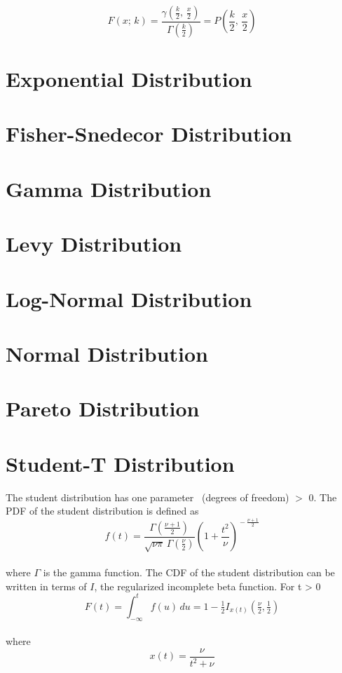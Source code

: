		$$F(x;\,k) = \frac{\gamma(\frac{k}{2},\,\frac{x}{2})}{\Gamma(\frac{k}{2})} = P\left(\frac{k}{2},\,\frac{x}{2}\right)$$


	\section{Exponential Distribution}

	\section{Fisher-Snedecor Distribution}

	\section{Gamma Distribution}

	\section{Levy Distribution}

	\section{Log-Normal Distribution}

	\section{Normal Distribution}

	\section{Pareto Distribution}

	\section{Student-T Distribution}
	
		The student distribution has one parameter \nu\ (degrees of freedom) $>$ 0. The \ac{PDF} of the student distribution is defined as
		\\
		$$f(t) = \frac{\Gamma(\frac{\nu+1}{2})} {\sqrt{\nu\pi}\,\Gamma(\frac{\nu}{2})} \left(1+\frac{t^2}{\nu} \right)^{\!-\frac{\nu+1}{2}}$$
		\\
		where $\Gamma$ is the gamma function. The \ac{CDF} of the student distribution can be written in terms of $I$, the regularized incomplete beta function. For t > 0
		\\
		$$F(t) = \int_{-\infty}^t f(u)\,du = 1 - \tfrac{1}{2} I_{x(t)}\left(\tfrac{\nu}{2}, \tfrac{1}{2}\right)$$
		\\
		where $$x(t) = \frac{\nu}{{t^2+\nu}}$$

